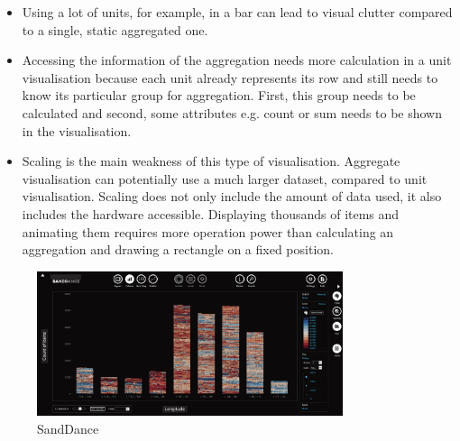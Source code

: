 \begin{itemize}
\item Using a lot of units, for example, in a bar can lead to visual clutter compared to a single, static aggregated one.

\item Accessing the information of the aggregation needs more calculation in a unit visualisation because each unit already represents its row and still needs to know its particular group for aggregation. First, this group needs to be calculated and second, some attributes e.g. count or sum needs to be shown in the visualisation.

\item Scaling is the main weakness of this type of visualisation. Aggregate visualisation can potentially use a much larger dataset, compared to unit visualisation. Scaling does not only include the amount of data used, it also includes the hardware accessible. Displaying thousands of items and animating them requires more operation power than calculating an aggregation and drawing a rectangle on a fixed position.

\end{itemize}

\begin{figure}[!htb]
\centering
\includegraphics[width=0.8\textwidth,keepaspectratio]{images/methods/related/sanddance.png}
\caption[
    Concept of SandDance .
]{SandDance}
\label{fig:sanddance}
\end{figure}

